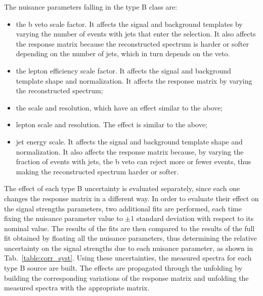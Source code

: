 The nuisance parameters falling in the type B class are:
\begin{itemize}
\item the b veto scale factor. It affects the signal and background templates
by varying the number of events with jets that enter the selection. It also
affects the response matrix because the reconstructed spectrum is harder or softer depending on the number of jets, which in turn depends on the veto. 
\item the lepton efficiency scale factor. It affects the signal and background
template shape and normalization. It affects the response matrix by varying
the reconstructed spectrum;
\item the \MET scale and resolution, which have an effect similar to the above;
\item lepton scale and resolution. The effect is similar to the above;
\item jet energy scale. It affects the signal and background template shape
and normalization. It also affects the response matrix because, by varying the
fraction of events with jets, the b veto can reject more or fewer events, thus
making the reconstructed spectrum harder or softer.
\end{itemize}
The effect of each type B uncertainty is evaluated separately,
since each one changes the response matrix in a different way.
In order to evaluate their effect on the signal strengths parameters, two additional fits are
performed, each time fixing  the nuisance parameter value to $\pm 1$  standard
deviation with respect
to its nominal value. The results of the fits are then compared to the results of the full fit obtained by floating  all the nuisance parameters, thus 
determining the relative uncertainty on the signal strengths due to each
nuisance parameter, as shown in Tab.~\ref{table:corr_syst}.
Using these uncertainties, the measured spectra for each type B
source are built.
The effects are propagated through the unfolding by building the corresponding variations of the response matrix and unfolding the
measured spectra with the appropriate matrix.

